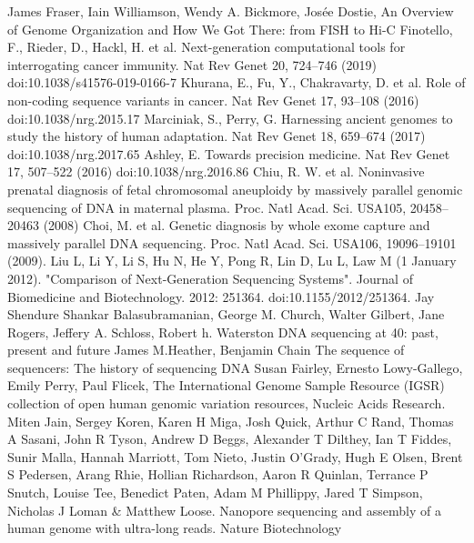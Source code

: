 \documentclass[a4paper,11pt,twoside]{report}
\theoremstyle{definition}
\begin{document}
\begin{thebibliography}{20}%
James Fraser, Iain Williamson, Wendy A. Bickmore,  Josée Dostie, An Overview of Genome Organization and How We Got There: from FISH to Hi-C
Finotello, F., Rieder, D., Hackl, H. et al. Next-generation computational tools for interrogating cancer immunity. Nat Rev Genet 20, 724–746 (2019) doi:10.1038/s41576-019-0166-7
Khurana, E., Fu, Y., Chakravarty, D. et al. Role of non-coding sequence variants in cancer. Nat Rev Genet 17, 93–108 (2016) doi:10.1038/nrg.2015.17
 Marciniak, S., Perry, G. Harnessing ancient genomes to study the history of human adaptation. Nat Rev Genet 18, 659–674 (2017) doi:10.1038/nrg.2017.65
 Ashley, E. Towards precision medicine. Nat Rev Genet 17, 507–522 (2016) doi:10.1038/nrg.2016.86
 Chiu, R. W. et al. Noninvasive prenatal diagnosis of fetal chromosomal aneuploidy by massively parallel genomic sequencing of DNA in maternal plasma. Proc. Natl Acad. Sci. USA105, 20458–20463 (2008)
 Choi, M. et al. Genetic diagnosis by whole exome capture and massively parallel DNA sequencing. Proc. Natl Acad. Sci. USA106, 19096–19101 (2009).
 Liu L, Li Y, Li S, Hu N, He Y, Pong R, Lin D, Lu L, Law M (1 January 2012). "Comparison of Next-Generation Sequencing Systems". Journal of Biomedicine and Biotechnology. 2012: 251364. doi:10.1155/2012/251364.
 Jay Shendure Shankar Balasubramanian, George M. Church, Walter Gilbert, Jane Rogers, Jeffery A. Schloss, Robert h. Waterston DNA sequencing at 40: past, present and future
 James M.Heather, Benjamin Chain The sequence of sequencers: The history of sequencing DNA
 Susan Fairley, Ernesto Lowy-Gallego, Emily Perry, Paul Flicek, The International Genome Sample Resource (IGSR) collection of open human genomic variation resources, Nucleic Acids Research.
 Miten Jain, Sergey Koren, Karen H Miga, Josh Quick, Arthur C Rand, Thomas A Sasani, John R Tyson, Andrew D Beggs, Alexander T Dilthey, Ian T Fiddes, Sunir Malla, Hannah Marriott, Tom Nieto, Justin O'Grady, Hugh E Olsen, Brent S Pedersen, Arang Rhie, Hollian Richardson, Aaron R Quinlan, Terrance P Snutch, Louise Tee, Benedict Paten, Adam M Phillippy, Jared T Simpson, Nicholas J Loman \& Matthew Loose. Nanopore sequencing and assembly of a human genome with ultra-long reads. Nature Biotechnology

\end{thebibliography}
\end{document}
